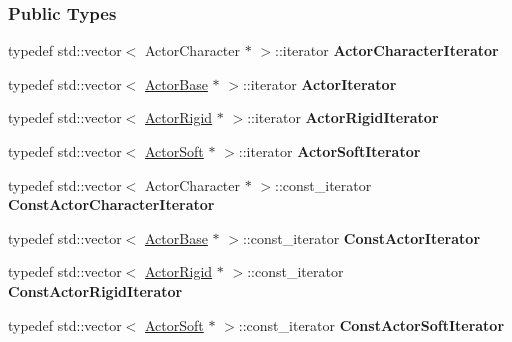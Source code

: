 \subsubsection*{Public Types}
\begin{DoxyCompactItemize}
\item 
\hypertarget{classMezzanine_1_1ActorManager_a436b56aadfc9f939454be461c904b8e5}{
typedef std::vector$<$ ActorCharacter $\ast$ $>$::iterator {\bfseries ActorCharacterIterator}}
\label{classMezzanine_1_1ActorManager_a436b56aadfc9f939454be461c904b8e5}

\item 
\hypertarget{classMezzanine_1_1ActorManager_a7adacffc50a291974d306a3008c18b87}{
typedef std::vector$<$ \hyperlink{classMezzanine_1_1ActorBase}{ActorBase} $\ast$ $>$::iterator {\bfseries ActorIterator}}
\label{classMezzanine_1_1ActorManager_a7adacffc50a291974d306a3008c18b87}

\item 
\hypertarget{classMezzanine_1_1ActorManager_ac4f47c8bddcfec7a4ae2904db967e020}{
typedef std::vector$<$ \hyperlink{classMezzanine_1_1ActorRigid}{ActorRigid} $\ast$ $>$::iterator {\bfseries ActorRigidIterator}}
\label{classMezzanine_1_1ActorManager_ac4f47c8bddcfec7a4ae2904db967e020}

\item 
\hypertarget{classMezzanine_1_1ActorManager_af182ad519a3381e8893a29db11b037db}{
typedef std::vector$<$ \hyperlink{classMezzanine_1_1ActorSoft}{ActorSoft} $\ast$ $>$::iterator {\bfseries ActorSoftIterator}}
\label{classMezzanine_1_1ActorManager_af182ad519a3381e8893a29db11b037db}

\item 
\hypertarget{classMezzanine_1_1ActorManager_a985136f1466c825eb2f4437243e0d892}{
typedef std::vector$<$ ActorCharacter $\ast$ $>$::const\_\-iterator {\bfseries ConstActorCharacterIterator}}
\label{classMezzanine_1_1ActorManager_a985136f1466c825eb2f4437243e0d892}

\item 
\hypertarget{classMezzanine_1_1ActorManager_ac623530bb722052c2f90e2e737d01f27}{
typedef std::vector$<$ \hyperlink{classMezzanine_1_1ActorBase}{ActorBase} $\ast$ $>$::const\_\-iterator {\bfseries ConstActorIterator}}
\label{classMezzanine_1_1ActorManager_ac623530bb722052c2f90e2e737d01f27}

\item 
\hypertarget{classMezzanine_1_1ActorManager_a08bfd16e9ea28fc9941aeb19a10145e2}{
typedef std::vector$<$ \hyperlink{classMezzanine_1_1ActorRigid}{ActorRigid} $\ast$ $>$::const\_\-iterator {\bfseries ConstActorRigidIterator}}
\label{classMezzanine_1_1ActorManager_a08bfd16e9ea28fc9941aeb19a10145e2}

\item 
\hypertarget{classMezzanine_1_1ActorManager_abe3c0c6a2cf63cd6795d7bd61b68acc0}{
typedef std::vector$<$ \hyperlink{classMezzanine_1_1ActorSoft}{ActorSoft} $\ast$ $>$::const\_\-iterator {\bfseries ConstActorSoftIterator}}
\label{classMezzanine_1_1ActorManager_abe3c0c6a2cf63cd6795d7bd61b68acc0}

\end{DoxyCompactItemize}
